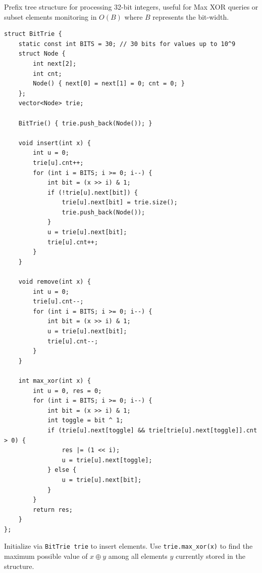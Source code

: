 
Prefix tree structure for processing 32-bit integers, useful for Max XOR queries or subset elements monitoring in $O(B)$ where $B$ represents the bit-width.
\begin{lstlisting}
struct BitTrie {
    static const int BITS = 30; // 30 bits for values up to 10^9
    struct Node {
        int next[2];
        int cnt;
        Node() { next[0] = next[1] = 0; cnt = 0; }
    };
    vector<Node> trie;

    BitTrie() { trie.push_back(Node()); }

    void insert(int x) {
        int u = 0;
        trie[u].cnt++;
        for (int i = BITS; i >= 0; i--) {
            int bit = (x >> i) & 1;
            if (!trie[u].next[bit]) {
                trie[u].next[bit] = trie.size();
                trie.push_back(Node());
            }
            u = trie[u].next[bit];
            trie[u].cnt++;
        }
    }

    void remove(int x) {
        int u = 0;
        trie[u].cnt--;
        for (int i = BITS; i >= 0; i--) {
            int bit = (x >> i) & 1;
            u = trie[u].next[bit];
            trie[u].cnt--;
        }
    }

    int max_xor(int x) {
        int u = 0, res = 0;
        for (int i = BITS; i >= 0; i--) {
            int bit = (x >> i) & 1;
            int toggle = bit ^ 1;
            if (trie[u].next[toggle] && trie[trie[u].next[toggle]].cnt > 0) {
                res |= (1 << i);
                u = trie[u].next[toggle];
            } else {
                u = trie[u].next[bit];
            }
        }
        return res;
    }
};
\end{lstlisting}

Initialize via \lstinline|BitTrie trie| to insert elements. Use \lstinline|trie.max_xor(x)| to find the maximum possible value of $x \oplus y$ among all elements $y$ currently stored in the structure.
